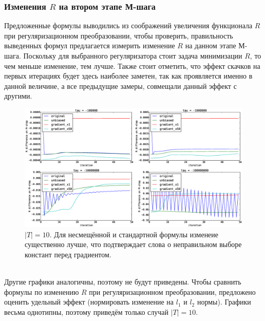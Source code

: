 \documentclass[12pt]{article}
\begin{document}
\subsubsection{Изменения $R$ на втором этапе М-шага}
Предложенные формулы выводились из соображений увеличения функционала $R$ при регуляризационном преобразовании, чтобы проверить, правильность выведенных формул предлагается измерить изменение $R$ на данном этапе М-шага. Поскольку для выбранного регуляризатора стоит задача минимизации $R$, то чем меньше изменение, тем лучше. Также стоит отметить, что эффект скачков на первых итерациях будет здесь наиболее заметен, так как проявляется именно в данной величине, а все предыдущие замеры, совмещали данный эффект с другими.
\begin{figure}[H]
	\centering
	\caption{$|T| = 10$. Для несмещённой и стандартной формулы изменеие существенно лучше, что подтверждает слова о неправильном выборе констант перед градиентом.}    
	\includegraphics[width=1.0\linewidth]{pictures/topics_10_RMstepDiff}
\end{figure}
\ \\
Другие графики аналогичны, поэтому не будут приведены. Чтобы сравнить формулы по изменению $R$ при регуляризационном преобразовании, предложено оценить удельный эффект (нормировать изменение на $l_1$ и $l_2$ нормы). Графики весьма однотипны, поэтому приведём только случай $|T| = 10$.
\end{document}
